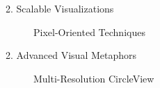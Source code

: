 \begin{frame}{2. Scalable Visualizations}
\begin{figure}
    \centering
    \caption{Pixel-Oriented Techniques}
    \label{fig:pixel-oriented-large}
\end{figure}
\end{frame}

\begin{frame}{2. Advanced Visual Metaphors}
    \begin{figure}
        \centering
        \caption{Multi-Resolution CircleView}
        \label{fig:multi-resolution}
    \end{figure}
\end{frame}

